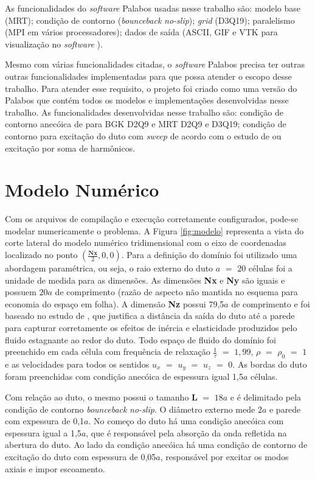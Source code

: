 As funcionalidades do \textit{software} Palabos usadas nesse trabalho são: modelo base (MRT); condição de contorno (\textit{bounceback} \textit{no-slip}); \textit{grid} (D3Q19); paralelismo (MPI em vários processadores); dados de saída (ASCII, GIF e VTK para visualização no \textit{software} ).

Mesmo com várias funcionalidades citadas, o \textit{software} Palabos precisa ter outras outras funcionalidades implementadas para que possa atender o escopo desse trabalho. Para atender esse requisito, o projeto  foi criado como uma versão do Palabos que contém todos os modelos e implementações desenvolvidas nesse trabalho. As funcionalidades desenvolvidas nesse trabalho são: condição de contorno anecóica de  para BGK D2Q9 e MRT D2Q9 e D3Q19; condição de contorno para excitação do duto com \textit{sweep} de acordo com o estudo de  ou excitação por soma de harmônicos.


\section{Modelo Numérico}

Com os arquivos de compilação e execução corretamente configurados, pode-se modelar numericamente o problema. A Figura \ref{fig:modelo} representa a vista do corte lateral do modelo numérico tridimensional com o eixo de coordenadas localizado no ponto $(\frac{\textbf{Nx}}{2}, 0, 0)$. Para a definição do domínio foi utilizado uma abordagem paramétrica, ou seja, o raio externo do duto $a$ $=$ $20$ células foi a unidade de medida para as dimensões. As dimensões \textbf{Nx} e \textbf{Ny} são iguais e possuem $20a$ de comprimento (razão de aspecto não mantida no esquema para economia do espaço em folha). A dimensão \textbf{Nz} possui 79,5$a$ de comprimento e foi baseado no estudo de , que justifica a distância da saída do duto até a parede para capturar corretamente os efeitos de inércia e elasticidade produzidos pelo fluido estagnante ao redor do duto. Todo espaço de fluido do domínio foi preenchido em cada célula com frequência de relaxação $\frac{1}{\tau}$ $=$ $1,99$, $\rho$ $=$ $\rho_{0}$ $=$ $1$ e as velocidades para todos os sentidos $u_{x}$ $=$ $u_{y}$ $=$ $u_{z}$ $=$ $0$. As bordas do duto foram preenchidas com condição anecóica de espessura igual 1,5$a$ células.      

Com relação ao duto, o mesmo possui o tamanho \textbf{L} $=$ $18a$ e é delimitado pela condição de contorno \textit{bounceback} \textit{no-slip}. O diâmetro externo mede $2a$ e parede com expessura de 0,1$a$. No começo do duto há uma condição anecóica com espessura igual a 1,5$a$, que é responsável pela absorção da onda refletida na abertura do duto. Ao lado da condição anecóica há uma condição de contorno de excitação do duto com espessura de 0,05$a$, responsável por excitar os modos axiais e impor escoamento.    

